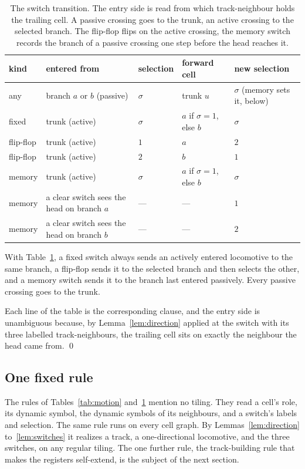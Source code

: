 \begin{table}[ht]
\centering
\begin{tabular}{@{}lllll@{}}
\toprule
kind & entered from & selection & forward cell & new selection \\
\midrule
any & branch $a$ or $b$ (passive) & $\sigma$ & trunk $u$ & $\sigma$ (memory sets it, below) \\
fixed & trunk (active) & $\sigma$ & $a$ if $\sigma{=}1$, else $b$ & $\sigma$ \\
flip-flop & trunk (active) & $1$ & $a$ & $2$ \\
flip-flop & trunk (active) & $2$ & $b$ & $1$ \\
memory & trunk (active) & $\sigma$ & $a$ if $\sigma{=}1$, else $b$ & $\sigma$ \\
\midrule
memory & a clear switch sees the head on branch $a$ & --- & --- & $1$ \\
memory & a clear switch sees the head on branch $b$ & --- & --- & $2$ \\
\bottomrule
\end{tabular}
\caption{The switch transition. The entry side is read from which track-neighbour holds the trailing cell. A
passive crossing goes to the trunk, an active crossing to the selected branch. The flip-flop flips on the
active crossing, the memory switch records the branch of a passive crossing one step before the head reaches
it.}
\label{tab:switch}
\end{table}

\begin{lemma}[Switches]
\label{lem:switches}
With Table~\ref{tab:switch}, a fixed switch always sends an actively entered locomotive to the same branch, a
flip-flop sends it to the selected branch and then selects the other, and a memory switch sends it to the
branch last entered passively. Every passive crossing goes to the trunk.
\end{lemma}

Each line of the table is the corresponding clause, and the entry side is unambiguous because, by
Lemma~\ref{lem:direction} applied at the switch with its three labelled track-neighbours, the trailing cell
sits on exactly the neighbour the head came from. \qed

\subsection{One fixed rule}

The rules of Tables~\ref{tab:motion} and~\ref{tab:switch} mention no tiling. They read a cell's role, its
dynamic symbol, the dynamic symbols of its neighbours, and a switch's labels and selection. The same rule runs
on every cell graph. By Lemmas~\ref{lem:direction} to~\ref{lem:switches} it realizes a track, a one-directional
locomotive, and the three switches, on any regular tiling. The one further rule, the track-building rule that
makes the registers self-extend, is the subject of the next section.
